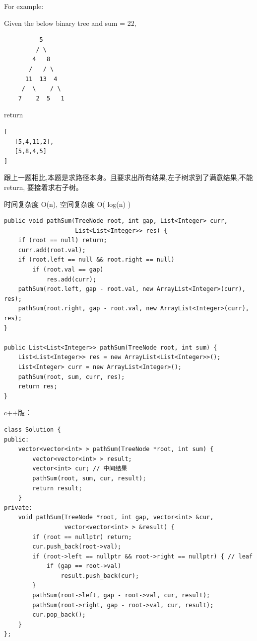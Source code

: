 \documentclass[12pt]{book}
\begin{document}
For example:

Given the below binary tree and sum = 22,
\lstset{language=java,label= ,caption= ,numbers=none}
\begin{lstlisting}
          5
         / \
        4   8
       /   / \
      11  13  4
     /  \    / \
    7    2  5   1
\end{lstlisting}

return
\lstset{language=java,label= ,caption= ,numbers=none}
\begin{lstlisting}
[
   [5,4,11,2],
   [5,8,4,5]
]
\end{lstlisting}

跟上一题相比,本题是求路径本身。且要求出所有结果,左子树求到了满意结果,不能 return, 要接着求右子树。

时间复杂度 O(n), 空间复杂度 O( log(n) )

\lstset{language=java,label= ,caption= ,numbers=none}
\begin{lstlisting}
public void pathSum(TreeNode root, int gap, List<Integer> curr,
                    List<List<Integer>> res) {
    if (root == null) return;
    curr.add(root.val);
    if (root.left == null && root.right == null) 
        if (root.val == gap) 
            res.add(curr);
    pathSum(root.left, gap - root.val, new ArrayList<Integer>(curr), res);
    pathSum(root.right, gap - root.val, new ArrayList<Integer>(curr), res);
}
        
public List<List<Integer>> pathSum(TreeNode root, int sum) {
    List<List<Integer>> res = new ArrayList<List<Integer>>();
    List<Integer> curr = new ArrayList<Integer>();
    pathSum(root, sum, curr, res);
    return res;
}
\end{lstlisting}

c++版：
\lstset{language=java,label= ,caption= ,numbers=none}
\begin{lstlisting}
class Solution {
public:
    vector<vector<int> > pathSum(TreeNode *root, int sum) {
        vector<vector<int> > result;
        vector<int> cur; // 中间结果
        pathSum(root, sum, cur, result);
        return result;
    }
private:
    void pathSum(TreeNode *root, int gap, vector<int> &cur,
                 vector<vector<int> > &result) {
        if (root == nullptr) return;
        cur.push_back(root->val);
        if (root->left == nullptr && root->right == nullptr) { // leaf
            if (gap == root->val)
                result.push_back(cur);
        }
        pathSum(root->left, gap - root->val, cur, result);
        pathSum(root->right, gap - root->val, cur, result);
        cur.pop_back();
    }
};
\end{lstlisting}
\end{document}

